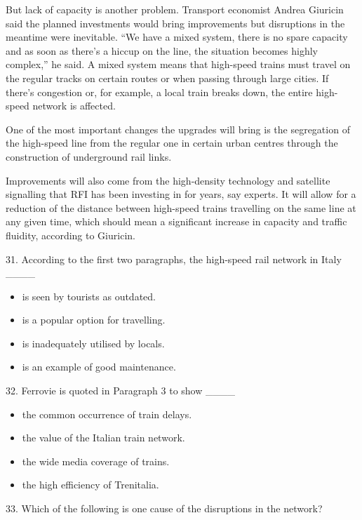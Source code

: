 \documentclass[UTF8,11pt]{ctexart}
\begin{document}
But lack of capacity is another problem. Transport economist Andrea Giuricin said the planned investments would bring improvements but disruptions in the meantime were inevitable. “We have a mixed system, there is no spare capacity and as soon as there’s a hiccup on the line, the situation becomes highly complex,” he said. A mixed system means that high-speed trains must travel on the regular tracks on certain routes or when passing through large cities. If there’s congestion or, for example, a local train breaks down, the entire high-speed network is affected.


One of the most important changes the upgrades will bring is the segregation of the high-speed line from the regular one in certain urban centres through the construction of underground rail links.


Improvements will also come from the high-density technology and satellite signalling that RFI has been investing in for years, say experts. It will allow for a reduction of the distance between high-speed trains travelling on the same line at any given time, which should mean a significant increase in capacity and traffic fluidity, according to Giuricin.


31. According to the first two paragraphs, the high-speed rail network in Italy \_\_\_\_


\begin{itemize}[leftmargin=2em,itemsep=.2em,topsep=.4em]\item[A.] is seen by tourists as outdated.
\item[B.] is a popular option for travelling.
\item[C.] is inadequately utilised by locals.
\item[D.] is an example of good maintenance.
\end{itemize}

32. Ferrovie is quoted in Paragraph 3 to show \_\_\_\_


\begin{itemize}[leftmargin=2em,itemsep=.2em,topsep=.4em]\item[A.] the common occurrence of train delays.
\item[B.] the value of the Italian train network.
\item[C.] the wide media coverage of trains.
\item[D.] the high efficiency of Trenitalia.
\end{itemize}

33. Which of the following is one cause of the disruptions in the network?
\end{document}
